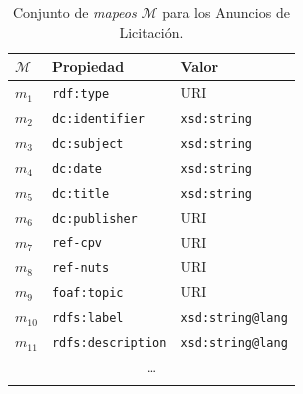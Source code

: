 \begin{longtable}[c]{|p{2cm}|p{8cm}|p{4cm}|} 
\hline
  \textbf{$\mathcal{M}$} &  \textbf{Propiedad} & \textbf{Valor} \\\hline
\endhead
 $m_1$ & \texttt{rdf:type} & URI \\ \hline
 $m_2$ & \texttt{dc:identifier} & \texttt{xsd:string} \\ \hline
 $m_3$ & \texttt{dc:subject} & \texttt{xsd:string} \\ \hline
 $m_4$ & \texttt{dc:date} & \texttt{xsd:string}   \\ \hline
 $m_5$ & \texttt{dc:title} & \texttt{xsd:string}   \\ \hline
 $m_6$ & \texttt{dc:publisher} &  URI  \\ \hline
 $m_7$ & \texttt{ref-cpv} & URI \\ \hline
 $m_8$ & \texttt{ref-nuts} & URI  \\ \hline
 $m_{9}$ & \texttt{foaf:topic} & URI \\ \hline  
 $m_{10}$ & \texttt{rdfs:label} & \texttt{xsd:string@lang} \\ \hline
 $m_{11}$ & \texttt{rdfs:description} & \texttt{xsd:string@lang} \\ \hline    
  \multicolumn{3}{|c|}{\ldots} \\ \hline  
\hline
\caption{Conjunto de \textit{mapeos} $\mathcal{M}$ para los Anuncios de Licitación.}\label{tabla:produccion-ppn}\\    
\end{longtable}
% 
